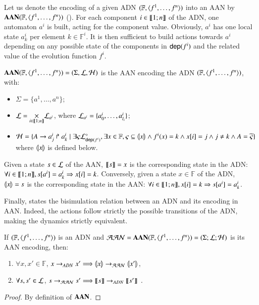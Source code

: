 Let us denote the encoding of a given ADN $\DNdef$ into an AAN by $\toPH\DNdef$ ().
For each component $i\in\segm{1}{n}$ of the ADN,
one automaton $a^i$ is built, acting for the component value.
Obviously, $a^i$ has one local state $a^i_k$ per element $k \in \mathbb F^i$.
It is then sufficient to build actions towards $a^i$
depending on any possible state of the components in $\DNdep(f^i)$
and the related value of the evolution function $f^i$.

\begin{definition}
\label{def:DN2PH}
  $\toPH\DNdef=(\Sigma,\PHl,\Hits)$ is the AAN encoding the ADN $\DNdef$, with:
  \begin{itemize}
    \item $\Sigma = \{ a^1, \dots, a^n \}$;
    
    \item $\PHl=\underset{i\in\segm{1}{n}}{\times} \PHl_{a^i}$, where
      $\PHl_{a^i}=\{a^i_0, \dots, a^i_{l_i}\}$;
    
    \item $\PHh = \{ \PHfrappe{A}{a^i_j}{a^i_k} \mid
      \exists \varsigma \PHsubl[\PHl]_{\DNdep(f^i)}, \exists x \in \mathbb{F},
      \varsigma \subseteq \encode{x} \wedge
      f^i(x) = k \wedge \PHget{x}{i} = j \wedge j \neq k \wedge
      A = \toset{\varsigma} \}$ where $\encode{x}$ is defined below.
  \end{itemize}
  Given a state $s \in \PHl$ of the AAN,
  $\decode s=x$ is the corresponding state in the ADN:
  $\forall i\in\segm{1}{n}, \get{s}{a^i}=a^i_k \Rightarrow \get{x}{i}=k$.
  Conversely, given a state $x\in \mathbb F$ of the ADN, 
  $\encode x=s$ is the corresponding state in the AAN:
  $\forall i\in\segm{1}{n}, \get{x}{i}=k \Rightarrow \get{s}{a^i}=a^i_k$.
\end{definition}

Finally,
 states the bisimulation relation between an ADN and its encoding in AAN.
Indeed, the actions follow strictly the possible transitions of the ADN,
making the dynamics strictly equivalent.

\begin{theorem}[$\DNdef \approx \toPH\DNdef$]
\label{th:bisimDN}
  If $\DNdef$ is an ADN
  and $\PH = \toPH\DNdef = (\PHs; \PHl; \PHa)$ is its AAN encoding, then:
  \begin{enumerate}
    \item \label{adn2ph} $\forall x,x'\in\mathbb F$,
      $x\DNtrans x' \Longrightarrow \encode x \PHPtrans \encode{x'}$,
    \item \label{ph2adn} $\forall s,s'\in \PHl$,
      $s\PHPtrans s' \Longrightarrow \decode s \DNtrans
      \decode{s'}\enspace.$
  \end{enumerate}
\end{theorem}

\begin{proof}
  By definition of $\toPH$.
\end{proof}

